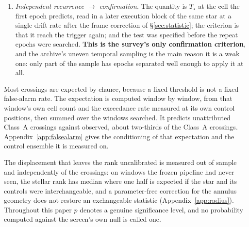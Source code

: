 \begin{enumerate}[label=(\roman*),leftmargin=1.9em,itemsep=3pt,topsep=3pt,parsep=0pt]
{significance test.} The stellar and control positions are not demonstrably
exchangeable, so no per-window false-alarm probability can be attached to
the rank; and the filter responds to compactness rather than to origin. The
clearest demonstration is $\beta$~Pictoris, where genuine carbon monoxide
fails the screen because the resolved disc lifts the control positions along
with the star. \emph{The screen measures compactness rather than
authenticity}, which is why it decides which crossings are examined and
never establishes one. Requiring it costs a factor $\times\ScrCostA$ in
sensitivity, comparing the two blanket figures: $\ScrTrigOnlyA\,P_{\rm
trig}$ at the trigger alone against $\EirpNinetyMultA\,P_{\rm trig}$ through
the screen. Almost all of that is paid in the disc-affected stratum --- where
the ring is noise the cost is only $\times\ScrCostNoise$ --- and every
completeness in this paper is charged for it (Appendix~\ref{app:radius}).
\item \emph{Independent recurrence $\to$ confirmation.} The quantity is
$T_\star$ at the cell the first epoch predicts, read in a later execution
block of the same star at a single drift rate after the frame correction of
\S\ref{sec:statistic}; the criterion is that it reach the trigger again; and
the test was specified before the repeat epochs were searched.
\textbf{This is the survey's only confirmation criterion}, and the archive's
uneven temporal sampling is the main reason it is a weak one: only part of
the sample has epochs separated well enough to apply it at all.
\end{enumerate}

Most crossings are expected by chance, because a fixed threshold is not a
fixed false-alarm rate. The expectation is computed window by window, from
that window's own cell count and the exceedance rate measured at its own
control positions, then summed over the windows searched. It predicts
\RsevChanceExp{} unattributed Class~A crossings against
\RsevChanceObsAUnattr{} observed, about two-thirds of the \NHitsA{} Class~A
crossings. Appendix~\ref{app:falsealarm} gives the conditioning of that
expectation and the control ensemble it is measured on.

The displacement that leaves the rank uncalibrated is measured out of sample
and independently of the crossings: on \HoWin{} windows the frozen pipeline
had never seen, the stellar rank has median \HoRankMed{} where one half is
expected if the star and its controls were interchangeable, and a
parameter-free correction for the annulus geometry does not restore an
exchangeable statistic (Appendix~\ref{app:radius}). Throughout this paper
$p$ denotes a genuine significance level, and no probability computed
against the screen's own null is called one.

